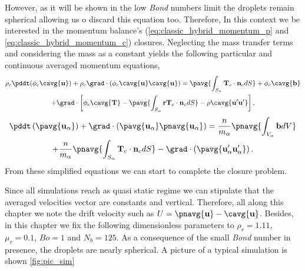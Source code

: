 However, as it will be shown in the low \textit{Bond} numbers limit the droplets remain spherical allowing us o discard this equation too. 
Therefore, In this context we be interested in the momentum balance's (\ref{eq:classic_hybrid_momentum_p} and \ref{eq:classic_hybrid_momentum_c}) closures. 
Neglecting the mass transfer terms and considering the mass as a constant yields the following particular and continuous averaged momentum equations, 
\begin{multline}
    \rho_c\pddt (\phi_c\cavg{\textbf{u}}) 
    + \rho_c\grad \cdot ( \phi_c \cavg{\textbf{u}}\cavg{\textbf{u}})
    = \pavg{\int_{S_\alpha} \textbf{T}_c  \cdot \textbf{n}_c d S}
    +\phi_c\cavg{\textbf{b}}\\
    + \grad\cdot\left[
    \phi_c \cavg{\textbf{T}}
    - \pavg{\int_{S_\alpha} \textbf{r} \textbf{T}_c  \cdot \textbf{n}_c dS}
    - \rho \cavg{\textbf{u}'\textbf{u}'}
    \right],
    \label{eq:homo_momentum_c}
\end{multline}
\begin{multline}
    \pddt   \left(\pavg{\textbf{u}_\alpha}\right)
    + \grad \cdot \left(\pavg{\textbf{u}_\alpha}\pnavg{\textbf{u}_\alpha}\right)
    = \frac{n}{m_\alpha}\pnavg{\int_{V_\alpha} \textbf{b} dV}\\
    + \frac{n}{m_\alpha}\pnavg{\int_{S_\alpha} \textbf{T}_c  \cdot \textbf{n}_c dS}
    - \grad \cdot \left(\pavg{\textbf{u}_\alpha' \textbf{u}_\alpha'}\right). 
    \label{eq:homo_momentum_p}
\end{multline}
From these simplified equations we can start to complete the closure problem.

Since all simulations reach as quasi static regime we can stipulate that the averaged velocities vector are constants and vertical. 
Therefore, all along this chapter we note the drift velocity such as $U = \pnavg{\textbf{u}} - \cavg{\textbf{u}}$. 
Besides, in this chapter we fix the following dimensionless parameters to $\rho_r =1.11 $, $\mu_r =0.1$, $Bo =1$ and $N_b = 125$. 
As a consequence of the small \textit{Bond} number in presence, the droplets are nearly spherical. 
A picture of a typical simulation is shown \ref{fig:pic_sim}